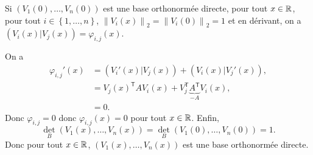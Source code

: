 \documentclass[12pt]{article}
\begin{document}
\begin{remark}
	Si $(V_1(0),\dots,V_n(0))$ est une base orthonormée directe, pour tout $x\in\mathbb{R}$, pour tout $i\in\left\lbrace1,\dots,n\right\rbrace$, $\left\lVert V_i(x)\right\rVert_{2}=\left\lVert V_i(0)\right\rVert_{2}=1$ et en dérivant, on a $(V_i(x)|V_j(x))=\varphi_{i,j}(x)$.

	On a 
	\begin{align}
		\varphi_{i,j}'(x)
		&=(V_i'(x)|V_j(x))+(V_i(x)|V_j'(x)),\\
		&=V_j(x)^{\mathsf{T}}AV_i(x)+V_j^{\mathsf{T}}\underbrace{A^{\mathsf{T}}}_{-A}V_i(x),\\
		&=0.
	\end{align}
	Donc $\varphi_{i,j}=0$ donc $\varphi_{i,j}(x)=0$ pour tout $x\in\mathbb{R}$. Enfin, \begin{equation}
		\det_{B}(V_1(x),\dots,V_n(x))=\det_{B}(V_1(0),\dots,V_n(0))=1.	
	\end{equation}
	Donc pour tout $x\in\mathbb{R}$, $(V_1(x),\dots,V_n(x))$ est une base orthonormée directe.
\end{remark}
\end{document}

